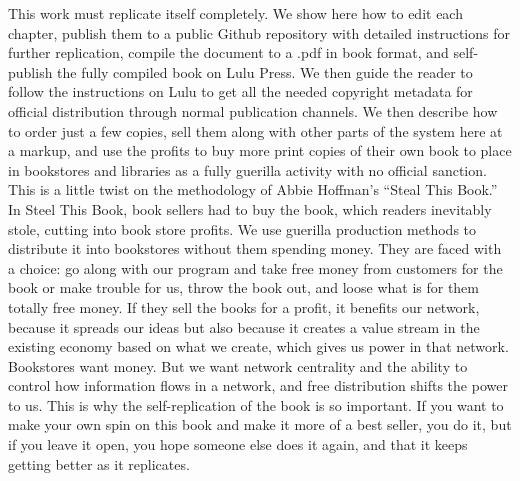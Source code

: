 This work must replicate itself completely.  We show here how to edit each chapter, publish them to a public Github repository with detailed instructions for further replication, compile the document to a .pdf in book format, and self-publish the fully compiled book on Lulu Press. We then guide the reader to follow the instructions on Lulu to get all the needed copyright metadata for official distribution through normal publication channels.  We then describe how to order just a few copies, sell them along with other parts of the system here at a markup, and use the profits to buy more print copies of their own book to place in bookstores and libraries as a fully guerilla activity with no official sanction.  This is a little twist on the methodology of Abbie Hoffman's ``Steal This Book.''  In Steel This Book, book sellers had to buy the book, which readers inevitably stole, cutting into book store profits.  We use guerilla production methods to distribute it into bookstores without them spending money.  They are faced with a choice: go along with our program and take free money from customers for the book or make trouble for us, throw the book out, and loose what is for them totally free money.  If they sell the books for a profit, it benefits our network, because it spreads our ideas but also because it creates a value stream in the existing economy based on what we create, which gives us power in that network.   Bookstores want money.  But we want network centrality and the ability to control how information flows in a network, and free distribution shifts the power to us.  This is why the self-replication of the book is so important.  If you want to make your own spin on this book and make it more of a best seller, you do it, but if you leave it open, you hope someone else does it again, and that it keeps getting better as it replicates.  